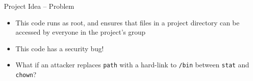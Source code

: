 \documentclass[aspectratio=169]{beamer}
\begin{document}
\begin{frame}[fragile]{Project Idea -- Problem}
	\begin{itemize}
		\item This code runs as root, and ensures that files in a project directory can be accessed by everyone in the project's group
	\end{itemize}

	\begin{example}
		\begin{semiverbatim}\end{semiverbatim}
	\end{example}

	\begin{itemize}
		\pause
		\item This code has a security bug!
		      \pause
		\item What if an attacker replaces \texttt{path} with a hard-link to \texttt{/bin} between \texttt{stat} and \texttt{chown}?
	\end{itemize}
\end{frame}
\end{document}
